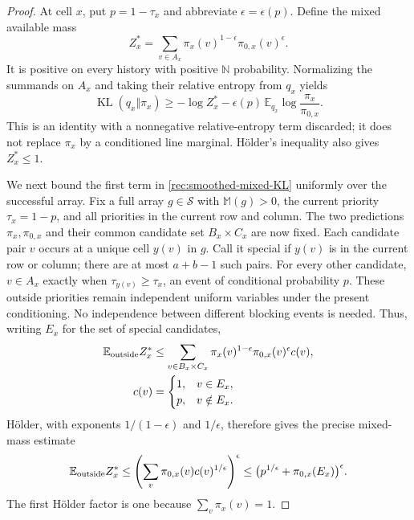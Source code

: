 \begin{proof}
At cell $x$, put $p=1-\tau_x$ and abbreviate
$\epsilon=\epsilon(p)$. Define the mixed available mass
\[
 Z_x^*=\sum_{v\in A_x}
                   \pi_x(v)^{1-\epsilon}\pi_{0,x}(v)^\epsilon.
\]
It is positive on every history with positive $\mathbb N$
probability. Normalizing the summands on $A_x$ and taking their
relative entropy from $q_x$ yields
\begin{equation}\label{rec:smoothed-mixed-KL}
 \operatorname{KL}(q_x\Vert\pi_x)
 \ge-\log Z_x^*
       -\epsilon(p)\,\mathbb E_{q_x}
                        \log\frac{\pi_x}{\pi_{0,x}}.
\end{equation}
This is an identity with a nonnegative relative-entropy term
discarded; it does not replace $\pi_x$ by a conditioned line
marginal. H\"older's inequality also gives $Z_x^*\le1$.

We next bound the first term in
\eqref{rec:smoothed-mixed-KL} uniformly over the successful array.
Fix a full array $g\in\mathcal S$ with $\mathbb M(g)>0$,
the current priority $\tau_x=1-p$, and all priorities in the
current row and column. The two predictions $\pi_x,\pi_{0,x}$
and their common candidate set $B_x\times C_x$ are now fixed.
Each candidate pair $v$ occurs at a unique cell $y(v)$ in $g$.
Call it special if $y(v)$ is in the current row or column; there
are at most $a+b-1$ such pairs. For every other candidate,
$v\in A_x$ exactly when $\tau_{y(v)}\ge\tau_x$, an event of
conditional probability $p$. These outside priorities remain
independent uniform variables under the present conditioning.
No independence between different blocking events is needed.
Thus, writing $E_x$ for the set of special candidates,
\begin{align*}
 \mathbb E_{\rm outside}Z_x^*
 &\le\sum_{v\in B_x\times C_x}
          \pi_x(v)^{1-\epsilon}\pi_{0,x}(v)^\epsilon c(v),\\
 c(v)&=\begin{cases}1,&v\in E_x,\\p,&v\notin E_x.\end{cases}
\end{align*}
H\"older, with exponents $1/(1-\epsilon)$ and $1/\epsilon$,
therefore gives the precise mixed-mass estimate
\begin{equation}\label{rec:smoothed-competitor-mass}
 \mathbb E_{\rm outside}Z_x^*
 \le\left(\sum_v\pi_{0,x}(v)c(v)^{1/\epsilon}\right)^\epsilon
 \le\bigl(p^{1/\epsilon}+\pi_{0,x}(E_x)\bigr)^\epsilon.
\end{equation}
The first H\"older factor is one because $\sum_v\pi_x(v)=1$.


\end{proof}
